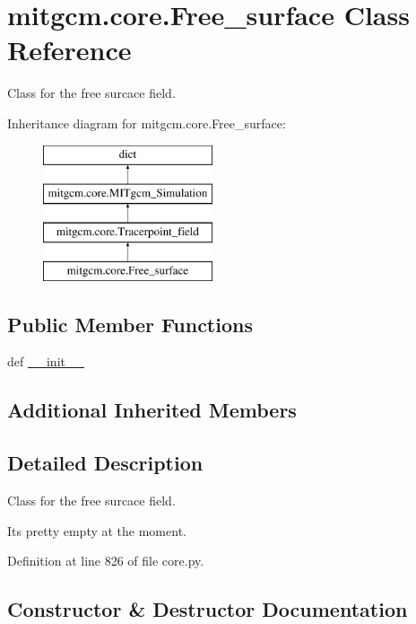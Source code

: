 \hypertarget{classmitgcm_1_1core_1_1Free__surface}{}\section{mitgcm.\+core.\+Free\+\_\+surface Class Reference}
\label{classmitgcm_1_1core_1_1Free__surface}


Class for the free surcace field.  


Inheritance diagram for mitgcm.\+core.\+Free\+\_\+surface\+:\begin{figure}[H]
\begin{center}
\leavevmode
\includegraphics[height=4.000000cm]{classmitgcm_1_1core_1_1Free__surface}
\end{center}
\end{figure}
\subsection*{Public Member Functions}
\begin{DoxyCompactItemize}
\item 
def \hyperlink{classmitgcm_1_1core_1_1Free__surface_aae91ac10ad70025da71f3694f063ec8b}{\+\_\+\+\_\+init\+\_\+\+\_\+}
\end{DoxyCompactItemize}
\subsection*{Additional Inherited Members}


\subsection{Detailed Description}
Class for the free surcace field. 

It\textquotesingle{}s pretty empty at the moment. 

Definition at line 826 of file core.\+py.



\subsection{Constructor \& Destructor Documentation}
\hypertarget{classmitgcm_1_1core_1_1Free__surface_aae91ac10ad70025da71f3694f063ec8b}{}
